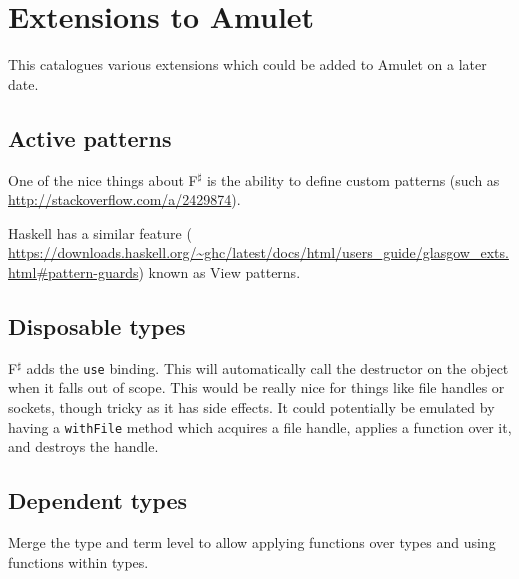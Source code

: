 \section{Extensions to Amulet}

This catalogues various extensions which could be added to Amulet on a later date.

\subsection{Active patterns}
One of the nice things about F$^\sharp$ is the ability to define custom patterns (such as \url{http://stackoverflow.com/a/2429874}). 

Haskell has a similar feature ( \url{https://downloads.haskell.org/~ghc/latest/docs/html/users_guide/glasgow_exts.html\#pattern-guards}) known as View patterns.

\subsection{Disposable types}
F$^\sharp$ adds the \texttt{use} binding. This will automatically call the destructor on the object when it falls out of scope. This would be really nice for things like file handles or sockets, though tricky as it has side effects. It could potentially be emulated by having a \texttt{withFile} method which acquires a file handle, applies a function over it, and destroys the handle.

\subsection{Dependent types}
Merge the type and term level to allow applying functions over types and using functions within types.